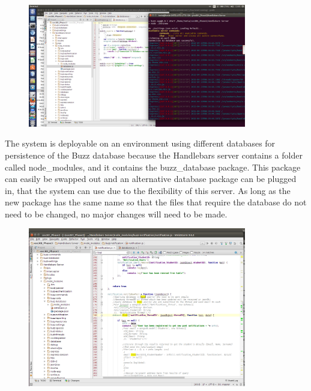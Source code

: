 \documentclass[hidelinks, 12pt, oneside]{article}
\begin{document}
\begin{enumerate}
\begin{figure}[h!]
  \centering
    \includegraphics[width=0.85\textwidth]{LinuxServerScreenShot} 
\end{figure}

The system is deployable on an environment using different databases for persistence of the Buzz database because the Handlebars server contains a folder called node\_modules, and it contains the buzz\_database package. This package can easily be swapped out and an alternative database package can be plugged in, that the system can use due to the flexibility of this server. As long as the new package has the same name so that the files that require the database do not need to be changed, no major changes will need to be made.  
 

\begin{figure}[h!]
  \centering
    \includegraphics[width=0.85\textwidth]{DatabaseSchema} 
\end{figure}


\end{enumerate}
\end{document}
